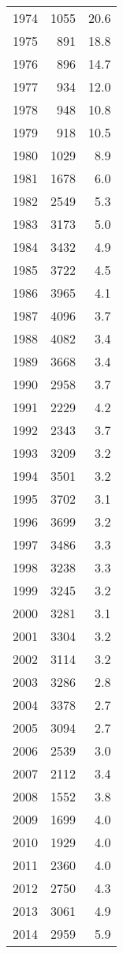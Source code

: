 \documentclass[]{article}
\begin{document}
\begin{table}[ht]
\begin{tabular}{rrr}
  1974 & 1055 & 20.6 \\ 
  1975 & 891 & 18.8 \\ 
  1976 & 896 & 14.7 \\ 
  1977 & 934 & 12.0 \\ 
  1978 & 948 & 10.8 \\ 
  1979 & 918 & 10.5 \\ 
  1980 & 1029 & 8.9 \\ 
  1981 & 1678 & 6.0 \\ 
  1982 & 2549 & 5.3 \\ 
  1983 & 3173 & 5.0 \\ 
  1984 & 3432 & 4.9 \\ 
  1985 & 3722 & 4.5 \\ 
  1986 & 3965 & 4.1 \\ 
  1987 & 4096 & 3.7 \\ 
  1988 & 4082 & 3.4 \\ 
  1989 & 3668 & 3.4 \\ 
  1990 & 2958 & 3.7 \\ 
  1991 & 2229 & 4.2 \\ 
  1992 & 2343 & 3.7 \\ 
  1993 & 3209 & 3.2 \\ 
  1994 & 3501 & 3.2 \\ 
  1995 & 3702 & 3.1 \\ 
  1996 & 3699 & 3.2 \\ 
  1997 & 3486 & 3.3 \\ 
  1998 & 3238 & 3.3 \\ 
  1999 & 3245 & 3.2 \\ 
  2000 & 3281 & 3.1 \\ 
  2001 & 3304 & 3.2 \\ 
  2002 & 3114 & 3.2 \\ 
  2003 & 3286 & 2.8 \\ 
  2004 & 3378 & 2.7 \\ 
  2005 & 3094 & 2.7 \\ 
  2006 & 2539 & 3.0 \\ 
  2007 & 2112 & 3.4 \\ 
  2008 & 1552 & 3.8 \\ 
  2009 & 1699 & 4.0 \\ 
  2010 & 1929 & 4.0 \\ 
  2011 & 2360 & 4.0 \\ 
  2012 & 2750 & 4.3 \\ 
  2013 & 3061 & 4.9 \\ 
  2014 & 2959 & 5.9 \\ 

\end{tabular}
\end{table}
\end{document}

